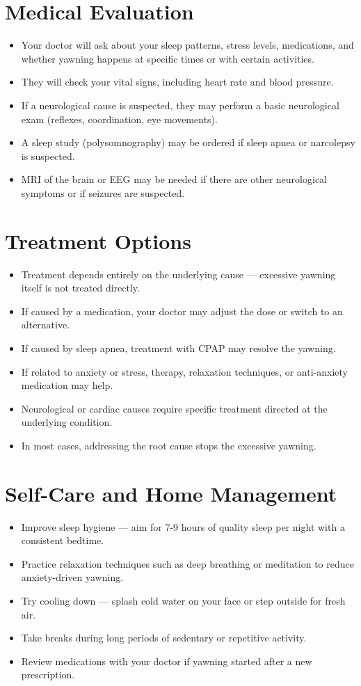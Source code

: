\section*{Medical Evaluation}
\begin{itemize}
  \item Your doctor will ask about your sleep patterns, stress levels, medications, and whether yawning happens at specific times or with certain activities.
  \item They will check your vital signs, including heart rate and blood pressure.
  \item If a neurological cause is suspected, they may perform a basic neurological exam (reflexes, coordination, eye movements).
  \item A sleep study (polysomnography) may be ordered if sleep apnea or narcolepsy is suspected.
  \item MRI of the brain or EEG may be needed if there are other neurological symptoms or if seizures are suspected.
\end{itemize}

\section*{Treatment Options}
\begin{itemize}
  \item Treatment depends entirely on the underlying cause — excessive yawning itself is not treated directly.
  \item If caused by a medication, your doctor may adjust the dose or switch to an alternative.
  \item If caused by sleep apnea, treatment with CPAP may resolve the yawning.
  \item If related to anxiety or stress, therapy, relaxation techniques, or anti-anxiety medication may help.
  \item Neurological or cardiac causes require specific treatment directed at the underlying condition.
  \item In most cases, addressing the root cause stops the excessive yawning.
\end{itemize}


\section*{Self-Care and Home Management}
\begin{itemize}
  \item Improve sleep hygiene — aim for 7-9 hours of quality sleep per night with a consistent bedtime.
  \item Practice relaxation techniques such as deep breathing or meditation to reduce anxiety-driven yawning.
  \item Try cooling down — splash cold water on your face or step outside for fresh air.
  \item Take breaks during long periods of sedentary or repetitive activity.
  \item Review medications with your doctor if yawning started after a new prescription.
\end{itemize}


